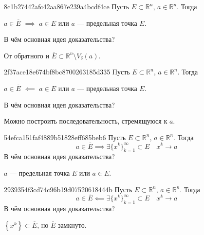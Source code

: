 \begin{note}{8c1b27442afc42aa867e239a4bcdf4ce}
    Пусть \({ E \subset \mathbb R^{n} }\),\: \({ a \in \mathbb R^{n} }\).
    Тогда
    \begin{center}
        \({ a \in \overline{E} }\) \({ \implies }\) \({ a \in E }\) или \({ a }\) --- предельная точка \({ E }\).
    \end{center}
    В чём основная идея доказательства?

    \begin{cloze}{1}
        От обратного и \({ \overline{E} \subset \mathbb R^{n} \setminus V_{\delta}(a) }\).
    \end{cloze}
\end{note}

\begin{note}{2f37ace18e674bf8bc8700263185d335}
    Пусть \({ E \subset \mathbb R^{n} }\),\: \({ a \in \mathbb R^{n} }\).
    Тогда
    \begin{center}
        \({ a \in \overline{E} }\) \({ \impliedby }\) \({ a \in E }\) или \({ a }\) --- предельная точка \({ E }\).
    \end{center}
    В чём основная идея доказательства?

    \begin{cloze}{1}
        Можно построить последовательность, стремящуюся к \({ a }\).
    \end{cloze}
\end{note}

\begin{note}{54efca151faf4889b51828eff685beb6}
    Пусть \({ E \subset \mathbb R^{n} }\),\: \({ a \in \mathbb R^{n} }\).
    Тогда
    \[
        a \in \overline{E} \implies \exists \{ x^{k} \}_{k = 1}^{\infty} \subset E \quad x^{k} \to a
    \]
    В чём основная идея доказательства?

    \begin{cloze}{1}
        \({ a }\) --- предельная точка \({ E }\) или \({ a \in E }\).
    \end{cloze}
\end{note}

\begin{note}{2939354f3cd74c96b19d07520618444b}
    Пусть \({ E \subset \mathbb R^{n} }\),\: \({ a \in \mathbb R^{n} }\).
    Тогда
    \[
        a \in \overline{E} \impliedby \exists \{ x^{k} \}_{k = 1}^{\infty} \subset E \quad x^{k} \to a
    \]
    В чём основная идея доказательства?

    \begin{cloze}{1}
        \({ \left\{ x^{k} \right\} \subset \overline{E} }\), но \({ \overline{E} }\) замкнуто.
    \end{cloze}
\end{note}

